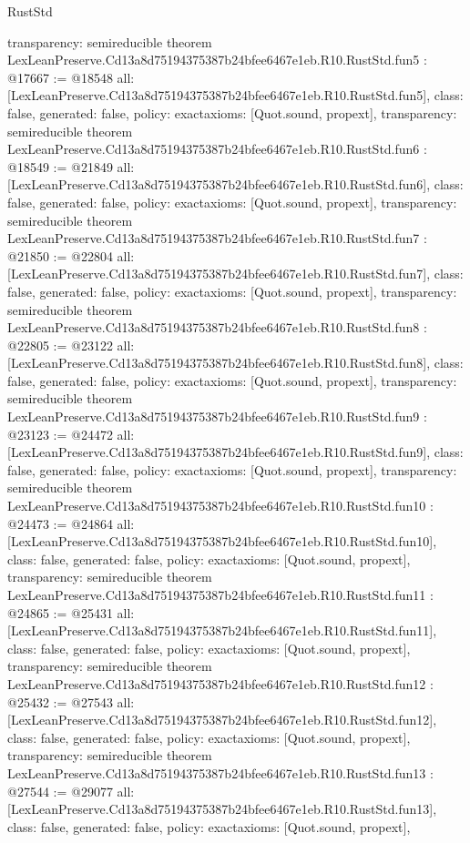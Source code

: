 \begin{lexlean}{RustStd}
\begin{coremodule}
{  transparency: semireducible
}
theorem LexLeanPreserve.Cd13a8d75194375387b24bfee6467e1eb.R10.RustStd.fun5 : @17667 := @18548 {
  all: [LexLeanPreserve.Cd13a8d75194375387b24bfee6467e1eb.R10.RustStd.fun5],
  class: false,
  generated: false,
  policy: exact{axioms: [Quot.sound, propext]},
  transparency: semireducible
}
theorem LexLeanPreserve.Cd13a8d75194375387b24bfee6467e1eb.R10.RustStd.fun6 : @18549 := @21849 {
  all: [LexLeanPreserve.Cd13a8d75194375387b24bfee6467e1eb.R10.RustStd.fun6],
  class: false,
  generated: false,
  policy: exact{axioms: [Quot.sound, propext]},
  transparency: semireducible
}
theorem LexLeanPreserve.Cd13a8d75194375387b24bfee6467e1eb.R10.RustStd.fun7 : @21850 := @22804 {
  all: [LexLeanPreserve.Cd13a8d75194375387b24bfee6467e1eb.R10.RustStd.fun7],
  class: false,
  generated: false,
  policy: exact{axioms: [Quot.sound, propext]},
  transparency: semireducible
}
theorem LexLeanPreserve.Cd13a8d75194375387b24bfee6467e1eb.R10.RustStd.fun8 : @22805 := @23122 {
  all: [LexLeanPreserve.Cd13a8d75194375387b24bfee6467e1eb.R10.RustStd.fun8],
  class: false,
  generated: false,
  policy: exact{axioms: [Quot.sound, propext]},
  transparency: semireducible
}
theorem LexLeanPreserve.Cd13a8d75194375387b24bfee6467e1eb.R10.RustStd.fun9 : @23123 := @24472 {
  all: [LexLeanPreserve.Cd13a8d75194375387b24bfee6467e1eb.R10.RustStd.fun9],
  class: false,
  generated: false,
  policy: exact{axioms: [Quot.sound, propext]},
  transparency: semireducible
}
theorem LexLeanPreserve.Cd13a8d75194375387b24bfee6467e1eb.R10.RustStd.fun10 : @24473 := @24864 {
  all: [LexLeanPreserve.Cd13a8d75194375387b24bfee6467e1eb.R10.RustStd.fun10],
  class: false,
  generated: false,
  policy: exact{axioms: [Quot.sound, propext]},
  transparency: semireducible
}
theorem LexLeanPreserve.Cd13a8d75194375387b24bfee6467e1eb.R10.RustStd.fun11 : @24865 := @25431 {
  all: [LexLeanPreserve.Cd13a8d75194375387b24bfee6467e1eb.R10.RustStd.fun11],
  class: false,
  generated: false,
  policy: exact{axioms: [Quot.sound, propext]},
  transparency: semireducible
}
theorem LexLeanPreserve.Cd13a8d75194375387b24bfee6467e1eb.R10.RustStd.fun12 : @25432 := @27543 {
  all: [LexLeanPreserve.Cd13a8d75194375387b24bfee6467e1eb.R10.RustStd.fun12],
  class: false,
  generated: false,
  policy: exact{axioms: [Quot.sound, propext]},
  transparency: semireducible
}
theorem LexLeanPreserve.Cd13a8d75194375387b24bfee6467e1eb.R10.RustStd.fun13 : @27544 := @29077 {
  all: [LexLeanPreserve.Cd13a8d75194375387b24bfee6467e1eb.R10.RustStd.fun13],
  class: false,
  generated: false,
  policy: exact{axioms: [Quot.sound, propext]},
}
\end{coremodule}
\end{lexlean}
